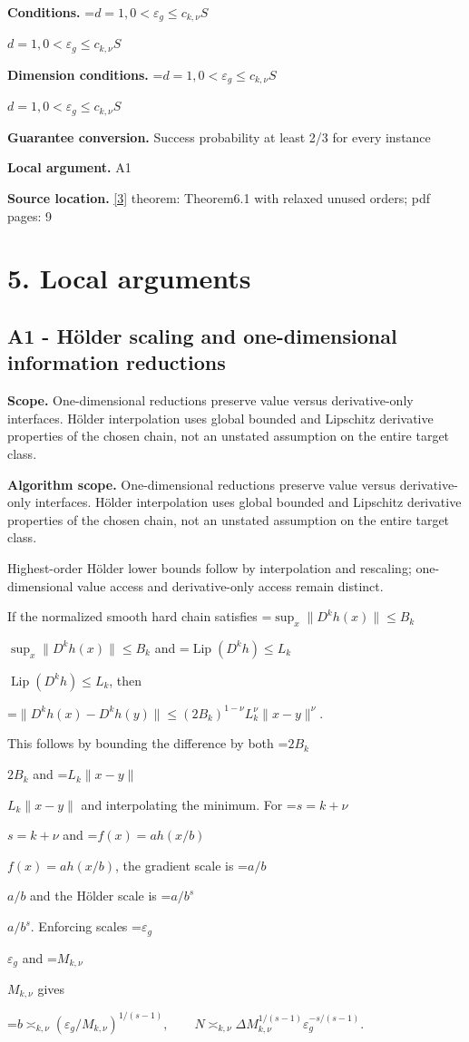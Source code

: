 \documentclass[10pt,a4paper]{article}
\newcommand{\AtlasMath}[1]{\par\begingroup\centering\setbox0=\hbox{$\displaystyle #1$}\ifdim\wd0>1.4\linewidth\typeout{ATLAS WIDE FORMULA: \the\wd0}\fi\ifdim\wd0>\linewidth\resizebox{\linewidth}{!}{\box0}\else\box0\fi\par\endgroup}
\newcommand{\AtlasInlineMath}[1]{\begingroup\setbox0=\hbox{$#1$}\ifdim\wd0>.4\linewidth\endgroup\AtlasMath{#1}\else\endgroup$#1$\fi}
\begin{document}
\textbf{Conditions.} \AtlasInlineMath{d=1,0<\varepsilon_g\le c_{k,\nu}S}

\textbf{Dimension conditions.} \AtlasInlineMath{d=1,0<\varepsilon_g\le c_{k,\nu}S}

\textbf{Guarantee conversion.} Success probability at least 2/3 for every instance

\textbf{Local argument.} A1

\textbf{Source location.} \href{https://arxiv.org/abs/2610.16295}{[3]} theorem: Theorem6.1 with relaxed unused orders; pdf pages: 9

\section{5. Local arguments}
\subsection{A1 - Hölder scaling and one-dimensional information reductions}
\textbf{Scope.} One-dimensional reductions preserve value versus derivative-only interfaces. Hölder interpolation uses global bounded and Lipschitz derivative properties of the chosen chain, not an unstated assumption on the entire target class.

\textbf{Algorithm scope.} One-dimensional reductions preserve value versus derivative-only interfaces. Hölder interpolation uses global bounded and Lipschitz derivative properties of the chosen chain, not an unstated assumption on the entire target class.

Highest-order Hölder lower bounds follow by interpolation and rescaling; one-dimensional value access and derivative-only access remain distinct.

If the normalized smooth hard chain satisfies \AtlasInlineMath{\sup_x\|D^kh(x)\|\le B_k} and \AtlasInlineMath{\operatorname{Lip}(D^kh)\le L_k}, then

\AtlasMath{\|D^kh(x)-D^kh(y)\|\le(2B_k)^{1-\nu}L_k^\nu\|x-y\|^\nu.}

This follows by bounding the difference by both \AtlasInlineMath{2B_k} and \AtlasInlineMath{L_k\|x-y\|} and interpolating the minimum. For \AtlasInlineMath{s=k+\nu} and \AtlasInlineMath{f(x)=a h(x/b)}, the gradient scale is \AtlasInlineMath{a/b} and the Hölder scale is \AtlasInlineMath{a/b^s}. Enforcing scales \AtlasInlineMath{\varepsilon_g} and \AtlasInlineMath{M_{k,\nu}} gives

\AtlasMath{b\asymp_{k,\nu}(\varepsilon_g/M_{k,\nu})^{1/(s-1)},\qquad
N\asymp_{k,\nu}\Delta M_{k,\nu}^{1/(s-1)}\varepsilon_g^{-s/(s-1)}.}
\end{document}
